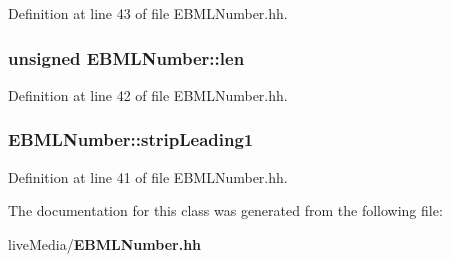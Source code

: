 Definition at line 43 of file E\+B\+M\+L\+Number.\+hh.

\subsubsection[{len}]{\setlength{\rightskip}{0pt plus 5cm}unsigned E\+B\+M\+L\+Number\+::len\hspace{0.3cm}{\ttfamily [inherited]}}\label{classEBMLNumber_a6b5f1ad3ad90d142dedbde1d15300e11}


Definition at line 42 of file E\+B\+M\+L\+Number.\+hh.

\subsubsection[{strip\+Leading1}]{ E\+B\+M\+L\+Number\+::strip\+Leading1\hspace{0.3cm}{\ttfamily [inherited]}}\label{classEBMLNumber_a6a5eeb12e3e64758586ce890b4beafca}


Definition at line 41 of file E\+B\+M\+L\+Number.\+hh.



The documentation for this class was generated from the following file\+:\begin{DoxyCompactItemize}
\item 
live\+Media/{\bf E\+B\+M\+L\+Number.\+hh}\end{DoxyCompactItemize}
